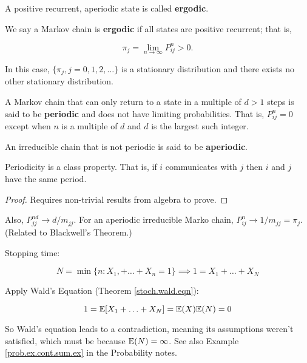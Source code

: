 \begin{definition}A positive recurrent, aperiodic state is called \textbf{ergodic}.

\end{definition}


\begin{definition}\label{stoch.def.ergodic}We say a Markov chain is \textbf{ergodic} if all states are positive recurrent; that is,

\[
\pi_j = \lim_{n \to \infty}P_{ij}^n > 0.
\]

In this case, \(\{\pi_j, j = 0, 1, 2, \ldots\}\) is a stationary distribution and there exists no other stationary distribution.

\end{definition}

\begin{definition}A Markov chain that can only return to a state in a multiple of \(d > 1\) steps is said to be \textbf{periodic} and does not have limiting probabilities. That is, \(P_{ij}^n = 0\) except when \(n\) is a multiple of \(d\) and \(d\) is the largest such integer.

An irreducible chain that is not periodic is said to be \textbf{aperiodic}. 

\end{definition}

\begin{lemma}Periodicity is a class property. That is, if \(i\) communicates with \(j\) then \(i\) and \(j\) have the same period. 

\end{lemma}

\begin{proof}Requires non-trivial results from algebra to prove.

\end{proof}

Also, \(P_{jj}^{nd} \to d/m_{jj}\). For an aperiodic irreducible Marko chain, \(P_{ij}^n \to 1/m_{jj} = \pi_j\). (Related to Blackwell's Theorem.)

\begin{example}\label{stoch.ex.cont} Stopping time:

\[
N = \min \{n: X_1, + \ldots + X_n = 1\} \implies 1 = X_1 + \ldots + X_N
\]

Apply Wald's Equation (Theorem \ref{stoch.wald.eqn}):

\[
1 = \E[ X_1 + \ldots + X_N] = \E(X) \E(N) = 0
\]

So Wald's equation leads to a contradiction, meaning its assumptions weren't satisfied, which must be because \(\E(N) = \infty\). See also Example \ref{prob.ex.cont.sum.ex} in the Probability notes.

\end{example}

